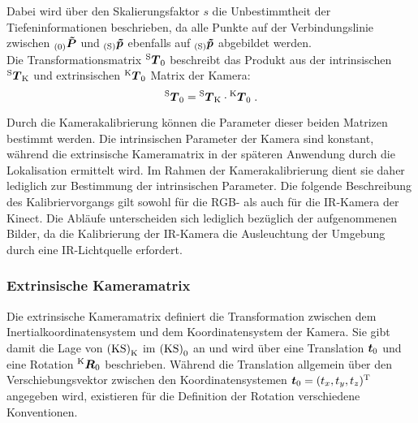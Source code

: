 
Dabei wird über den Skalierungsfaktor $s$ die Unbestimmtheit der Tiefeninformationen beschrieben, da alle Punkte auf der Verbindungslinie zwischen ${_{{\mathrm{(0)}}}}\mbox{\boldmath{$\tilde{P}$}}$ und ${_{{\mathrm{(S)}}}}\mbox{\boldmath{$\tilde{p}$}}$ ebenfalls auf ${_{{\mathrm{(S)}}}}\mbox{\boldmath{$\tilde{p}$}}$ abgebildet werden.\\ 
\prever{
}
Die Transformationsmatrix ${^{\mathrm{S}}\mbox{\boldmath{$T$}}_{\mathrm{0}}}$ beschreibt das Produkt aus der intrinsischen ${^{\mathrm{S}}\mbox{\boldmath{$T$}}_{\mathrm{K}}}$ und extrinsischen ${^{\mathrm{K}}\mbox{\boldmath{$T$}}_{\mathrm{0}}}$ Matrix der Kamera:
%
\begin{equation}
{^{\mathrm{S}}\mbox{\boldmath{$T$}}_{\mathrm{0}}} = {^{\mathrm{S}}\mbox{\boldmath{$T$}}_{\mathrm{K}}} \cdot {^{\mathrm{K}}\mbox{\boldmath{$T$}}_{\mathrm{0}}} \; \text{.}
\end{equation}

Durch die Kamerakalibrierung können die Parameter dieser beiden Matrizen bestimmt werden. Die intrinsischen Parameter der Kamera sind konstant, während die extrinsische Kameramatrix in der späteren Anwendung durch die Lokalisation ermittelt wird. Im Rahmen der Kamerakalibrierung dient sie daher lediglich zur Bestimmung der intrinsischen Parameter. Die folgende Beschreibung des Kalibriervorgangs gilt sowohl für die RGB- als auch für die IR-Kamera der Kinect. Die Abläufe unterscheiden sich lediglich bezüglich der aufgenommenen Bilder, da die Kalibrierung der IR-Kamera die Ausleuchtung der Umgebung durch eine IR-Lichtquelle erfordert.

\subsubsection{Extrinsische Kameramatrix}
\label{chap.perspproj}
\prever{
}
Die extrinsische Kameramatrix definiert die Transformation zwischen dem Inertialkoordinatensystem und dem Koordinatensystem der Kamera. Sie gibt damit die Lage von ${\mathrm{(KS)}}_{\mathrm{K}}$ im ${\mathrm{(KS)}}_{\mathrm{0}}$ an und wird über eine Translation $\mbox{\boldmath{$t$}}_{\mathrm{0}}$ und eine Rotation ${^{\mathrm{K}}\mbox{\boldmath{$R$}}_{\mathrm{0}}}$ beschrieben. Während die Translation allgemein über den Verschiebungsvektor zwischen den Koordinatensystemen $\mbox{\boldmath{$t$}}_{\mathrm{0}} = (t_x, t_y, t_z)^{\mathrm{T}}$ angegeben wird, existieren für die Definition der Rotation verschiedene Konventionen.\\

\prever{
}


